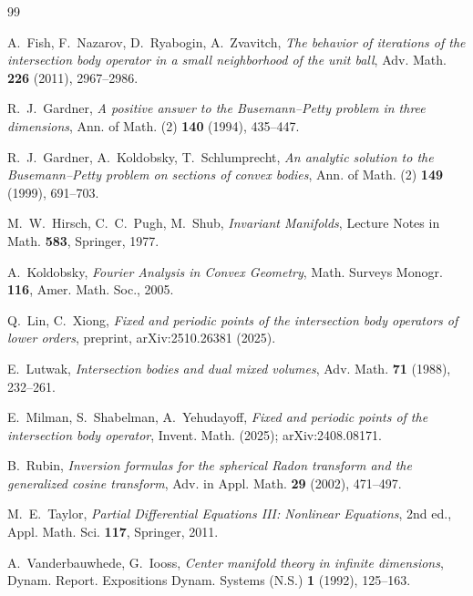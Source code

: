 \documentclass[11pt,reqno]{amsart}
\theoremstyle{plain}
\theoremstyle{definition}
\begin{document}
\begin{thebibliography}{99}

A.~Fish, F.~Nazarov, D.~Ryabogin, A.~Zvavitch,
\emph{The behavior of iterations of the intersection body operator in a small
neighborhood of the unit ball}, Adv. Math. \textbf{226} (2011), 2967--2986.

R.~J.~Gardner,
\emph{A positive answer to the Busemann--Petty problem in three dimensions},
Ann. of Math. (2) \textbf{140} (1994), 435--447.

R.~J.~Gardner, A.~Koldobsky, T.~Schlumprecht,
\emph{An analytic solution to the Busemann--Petty problem on sections of convex
bodies}, Ann. of Math. (2) \textbf{149} (1999), 691--703.

M.~W.~Hirsch, C.~C.~Pugh, M.~Shub,
\emph{Invariant Manifolds}, Lecture Notes in Math. \textbf{583},
Springer, 1977.

A.~Koldobsky,
\emph{Fourier Analysis in Convex Geometry},
Math. Surveys Monogr. \textbf{116}, Amer. Math. Soc., 2005.

Q.~Lin, C.~Xiong,
\emph{Fixed and periodic points of the intersection body operators of lower
orders}, preprint, arXiv:2510.26381 (2025).

E.~Lutwak,
\emph{Intersection bodies and dual mixed volumes},
Adv. Math. \textbf{71} (1988), 232--261.

E.~Milman, S.~Shabelman, A.~Yehudayoff,
\emph{Fixed and periodic points of the intersection body operator},
Invent. Math. (2025); arXiv:2408.08171.

B.~Rubin,
\emph{Inversion formulas for the spherical Radon transform and the generalized
cosine transform}, Adv. in Appl. Math. \textbf{29} (2002), 471--497.

M.~E.~Taylor,
\emph{Partial Differential Equations III: Nonlinear Equations},
2nd ed., Appl. Math. Sci. \textbf{117}, Springer, 2011.

A.~Vanderbauwhede, G.~Iooss,
\emph{Center manifold theory in infinite dimensions},
Dynam. Report. Expositions Dynam. Systems (N.S.) \textbf{1} (1992), 125--163.

\end{thebibliography}
\end{document}
